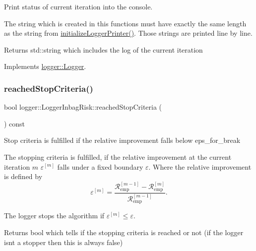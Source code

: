 Print status of current iteration into the console. 

The string which is created in this functions must have exactly the same length as the string from {\ttfamily \mbox{\hyperlink{classlogger_1_1_logger_inbag_risk_a17caab25f28cc05d9170c8ac2d910487}{initialize\+Logger\+Printer()}}}. Those strings are printed line by line.

\begin{DoxyReturn}{Returns}
{\ttfamily std\+::string} which includes the log of the current iteration 
\end{DoxyReturn}


Implements \mbox{\hyperlink{classlogger_1_1_logger_abad818a7e8053ca84cb267e883b5e377}{logger\+::\+Logger}}.

\mbox{\label{classlogger_1_1_logger_inbag_risk_a48453cfb5a3bbe3b1a73bbcb2d40f49e}} 
\subsubsection{\texorpdfstring{reached\+Stop\+Criteria()}{reachedStopCriteria()}}
{\footnotesize\ttfamily bool logger\+::\+Logger\+Inbag\+Risk\+::reached\+Stop\+Criteria (\begin{DoxyParamCaption}{ }\end{DoxyParamCaption}) const\hspace{0.3cm}{\ttfamily [virtual]}}



Stop criteria is fulfilled if the relative improvement falls below {\ttfamily eps\+\_\+for\+\_\+break} 

The stopping criteria is fulfilled, if the relative improvement at the current iteration $m$ $\varepsilon^{[m]}$ falls under a fixed boundary $\varepsilon$. Where the relative improvement is defined by \[ \varepsilon^{[m]} = \frac{\mathcal{R}_\mathrm{emp}^{[m-1]} - \mathcal{R}_\mathrm{emp}^{[m]}}{\mathcal{R}_\mathrm{emp}^{[m-1]}}. \]

The logger stops the algorithm if $\varepsilon^{[m]} \leq \varepsilon$.

\begin{DoxyReturn}{Returns}
{\ttfamily bool} which tells if the stopping criteria is reached or not (if the logger isn\textquotesingle{}t a stopper then this is always false) 
\end{DoxyReturn}


